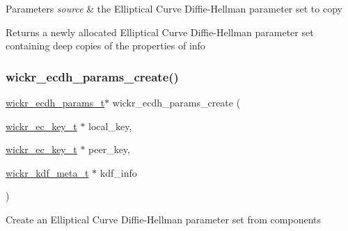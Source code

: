 \begin{DoxyParams}{Parameters}
{\em source} & the Elliptical Curve Diffie-\/\+Hellman parameter set to copy \\
\hline
\end{DoxyParams}
\begin{DoxyReturn}{Returns}
a newly allocated Elliptical Curve Diffie-\/\+Hellman parameter set containing deep copies of the properties of \textquotesingle{}info\textquotesingle{} 
\end{DoxyReturn}
\mbox{\label{group__wickr__ecdh__params_ga8a5be72f13caa4bf5ee99e16cc3b092f}} 
\subsubsection{\texorpdfstring{wickr\+\_\+ecdh\+\_\+params\+\_\+create()}{wickr\_ecdh\_params\_create()}}
{\footnotesize\ttfamily \hyperlink{structwickr__ecdh__params}{wickr\+\_\+ecdh\+\_\+params\+\_\+t}$\ast$ wickr\+\_\+ecdh\+\_\+params\+\_\+create (\begin{DoxyParamCaption}\item[{\hyperlink{structwickr__ec__key}{wickr\+\_\+ec\+\_\+key\+\_\+t} $\ast$}]{local\+\_\+key,  }\item[{\hyperlink{structwickr__ec__key}{wickr\+\_\+ec\+\_\+key\+\_\+t} $\ast$}]{peer\+\_\+key,  }\item[{\hyperlink{structwickr__kdf__meta}{wickr\+\_\+kdf\+\_\+meta\+\_\+t} $\ast$}]{kdf\+\_\+info }\end{DoxyParamCaption})}

Create an Elliptical Curve Diffie-\/\+Hellman parameter set from components



